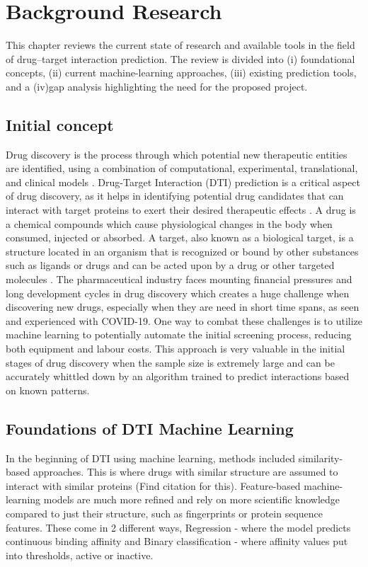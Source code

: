 \chapter{Background Research}
\sloppy
This chapter reviews the current state of research and available tools in the field of drug–target interaction prediction. The review is divided into (i) foundational concepts, (ii) current machine-learning approaches, (iii) existing prediction tools, and a (iv)gap analysis highlighting the need for the proposed project.
\section{Initial concept}
Drug discovery is the process through which potential new therapeutic entities are identified, using a combination of computational, experimental, translational, and clinical models \citep{Zhou2017}.
Drug-Target Interaction (DTI) prediction is a critical aspect of drug discovery, as it helps in identifying potential drug candidates that can interact with target proteins to exert their desired therapeutic effects \citep{Yang2024}.
A drug is a chemical compounds which cause physiological changes in the body when consumed, injected or absorbed. A target, also known as a biological target, is a structure located in an organism that is recognized or bound by other substances such as ligands or drugs and can be acted upon by a drug or other targeted molecules \citep{Overington2006}.
The pharmaceutical industry faces mounting financial pressures and long development cycles in drug discovery which creates a huge challenge when discovering new drugs, especially when they are need in short time spans, as seen and experienced with COVID-19. One way to combat these challenges is to utilize machine learning to potentially automate the initial screening process, reducing both equipment and labour costs. This approach is very valuable in the initial stages of drug discovery when the sample size is extremely large and can be accurately whittled down by an algorithm trained to predict interactions based on known patterns.


\section{Foundations of DTI Machine Learning}
In the beginning of DTI using machine learning, methods included similarity-based approaches. This is where drugs with similar structure are assumed to interact with similar proteins (Find citation for this). Feature-based machine-learning models are much more refined and rely on more scientific knowledge compared to just their structure, such as fingerprints or protein sequence features. These come in 2 different ways, Regression - where the model predicts continuous binding affinity and Binary classification - where affinity values put into thresholds, active or inactive.

